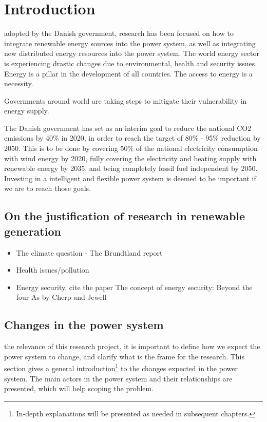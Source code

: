 \chapter{Introduction}

 adopted by the Danish government, research has been focused on how to integrate renewable energy sources into the power system, as well as integrating new distributed energy resources into the power system. The world energy sector is experiencing drastic changes due to environmental, health and security issues. 
Energy is a pillar in the development of all countries. The access to energy is a necessity.

Governments around world are taking steps to mitigate their vulnerability in energy supply.

The Danish government has set as an interim goal to reduce the national CO2 emissions by 40\% in 2020, in order to reach the target of 80\% - 95\% reduction by 2050. This is to be done by covering 50\% of the national electricity consumption with wind energy by 2020, fully covering the electricity and heating supply with renewable energy by 2035, and being completely fossil fuel independent by 2050. Investing in a intelligent and flexible power system is deemed to be important if we are to reach those goals.

\section{On the justification of research in renewable generation} %
\label{sec:justification}
\begin{itemize}
	\item The climate question - The Brundtland report
	\item Health issues/pollution
	\item Energy security, cite the paper The concept of energy security: Beyond the four As by Cherp and Jewell
\end{itemize}



\section{Changes in the power system}%
\label{sec:powsysdesc}
  the relevance of this research project, it is important to define how we expect the power system to change, and clarify what is the frame for the research. This section gives a general introduction\footnote{In-depth explanations will be presented as needed in subsequent chapters.} to the changes expected in the power system. The main actors in the power system and their relationships are presented, which will help scoping the problem.
